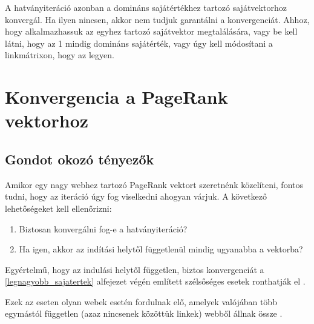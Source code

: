 \documentclass[12pt,a4paper]{article}
\begin{document}
A hatványiteráció azonban a domináns sajátértékhez tartozó sajátvektorhoz konvergál. Ha ilyen nincsen, akkor nem tudjuk garantálni a konvergenciát. Ahhoz, hogy alkalmazhassuk az egyhez tartozó sajátvektor megtalálására, vagy be kell látni, hogy az 1 mindig domináns sajátérték, vagy úgy kell módosítani a linkmátrixon, hogy az legyen.

\section{Konvergencia a PageRank vektorhoz}

\subsection{Gondot okozó tényezők}

Amikor egy nagy webhez tartozó PageRank vektort szeretnénk közelíteni, fontos tudni, hogy az iteráció úgy fog viselkedni ahogyan várjuk. A következő lehetőségeket kell ellenőrizni:

\begin{enumerate}
	\item Biztosan konvergálni fog-e a hatványiteráció?
	\item Ha igen, akkor az indítási helytől függetlenül mindig ugyanabba a vektorba? 
\end{enumerate}

Egyértelmű, hogy az indulási helytől független, biztos konvergenciát a \ref{legnagyobb_sajatertek} alfejezet végén említett szélsőséges esetek ronthatják el \cite{kleinproject}.

Ezek az eseten olyan webek esetén fordulnak elő, amelyek valójában több egymástól független (azaz nincsenek közöttük linkek) webből állnak össze \cite{kurt}.
\end{document}
